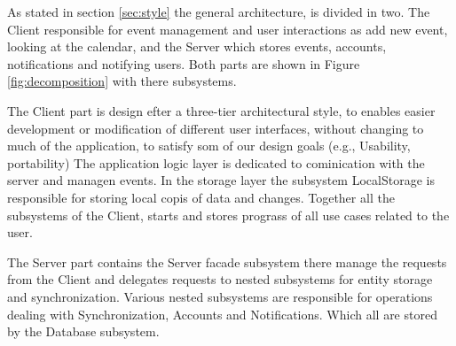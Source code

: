 \documentclass[a4paper]{article}
\begin{document}
As stated in section \ref{sec:style} the general architecture, is divided in two. The Client responsible for event management and user interactions as add new event, looking at the calendar, and the Server which stores events, accounts, notifications and notifying users. Both parts are shown in Figure \ref{fig:decomposition} with there subsystems.

The Client part is design efter a three-tier architectural style, to enables easier development or modification of different user interfaces, without changing to much of the application, to satisfy som of our design goals (e.g., Usability, portability) The application logic layer is dedicated to cominication with the server and managen events. In the storage layer the subsystem LocalStorage is responsible for storing local copis of data and changes. Together all the subsystems of the Client, starts and stores prograss of all use cases related to the user.

The Server part contains the Server facade subsystem there manage the requests from the Client and delegates requests to nested subsystems for entity storage and synchronization. Various nested subsystems are responsible for operations dealing with Synchronization, Accounts and Notifications. Which all are stored by the Database subsystem.
\end{document}
